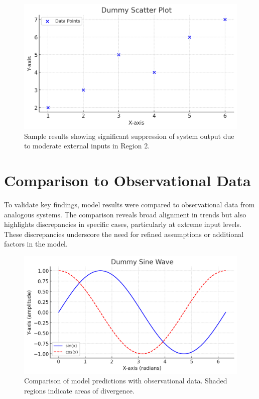 \begin{figure}[h!]
    \centering
    \includegraphics[width=130mm,scale=0.6]{body/images/placeholder_image3.png}
    \caption[Suppressed Dynamics]{Sample results showing significant suppression of system output due to moderate external inputs in Region 2.}
    \label{fig:region2_plot}
\end{figure}


\section{Comparison to Observational Data}
To validate key findings, model results were compared to observational data from analogous systems. The comparison reveals broad alignment in trends but also highlights discrepancies in specific cases, particularly at extreme input levels. These discrepancies underscore the need for refined assumptions or additional factors in the model.

\begin{figure}[h!]
    \centering
    \includegraphics[width=150mm,scale=0.9]{body/images/placeholder_image4.png}
    \caption[Model vs Observations]{Comparison of model predictions with observational data. Shaded regions indicate areas of divergence.}
    \label{fig:model_vs_observations}
\end{figure}

